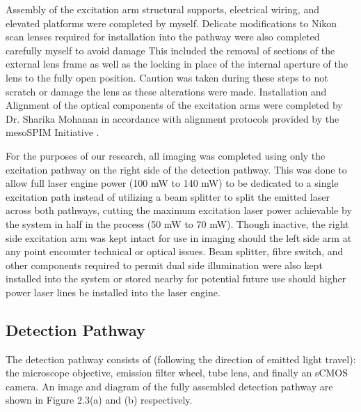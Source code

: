 Assembly of the excitation arm structural supports, electrical wiring, and elevated platforms were completed by myself. Delicate modifications to Nikon scan lenses required for installation into the pathway were also completed carefully myself to avoid damage \cite{vladimirov_mesospimbenchtop-hardware_2025} This included the removal of sections of the external lens frame as well as the locking in place of the internal aperture of the lens to the fully open position. Caution was taken during these steps to not scratch or damage the lens as these alterations were made. Installation and Alignment of the optical components of the excitation arms were completed by Dr. Sharika Mohanan in accordance with alignment protocols provided by the mesoSPIM Initiative \cite{vladimirov_mesospimbenchtop-hardware_2025}. 

For the purposes of our research, all imaging was completed using only the excitation pathway on the right side of the detection pathway. This was done to allow full laser engine power (100 mW to 140 mW) to be dedicated to a single excitation path instead of utilizing a beam splitter to split the emitted laser across both pathways, cutting the maximum excitation laser power achievable by the system in half in the process (50 mW to 70 mW). Though inactive, the right side excitation arm was kept intact for use in imaging should the left side arm at any point encounter technical or optical issues. Beam splitter, fibre switch, and other components required to permit dual side illumination were also kept installed into the system or stored nearby for potential future use should higher power laser lines be installed into the laser engine.

\newpage

\subsection{Detection Pathway}
The detection pathway consists of (following the direction of emitted light travel): the microscope objective, emission filter wheel, tube lens, and finally an sCMOS camera. An image and diagram of the fully assembled detection pathway are shown in Figure 2.3(a) and (b) respectively.

